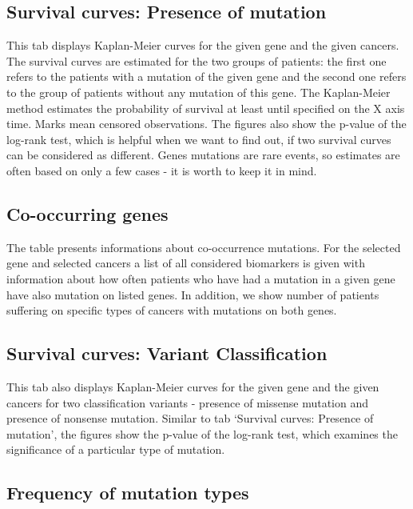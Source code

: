 \subsection{Survival curves: Presence of
mutation}\label{survival-curves-presence-of-mutation}

This tab displays Kaplan-Meier curves for the given gene and the given
cancers. The survival curves are estimated for the two groups of
patients: the first one refers to the patients with a mutation of the
given gene and the second one refers to the group of patients without
any mutation of this gene. The Kaplan-Meier method estimates the
probability of survival at least until specified on the X axis time.
Marks mean censored observations. The figures also show the p-value of
the log-rank test, which is helpful when we want to find out, if two
survival curves can be considered as different. Genes mutations are rare
events, so estimates are often based on only a few cases - it is worth
to keep it in mind.

\subsection{Co-occurring genes}\label{co-occurring-genes}

The table presents informations about co-occurrence mutations. For the
selected gene and selected cancers a list of all considered biomarkers
is given with information about how often patients who have had a
mutation in a given gene have also mutation on listed genes. In
addition, we show number of patients suffering on specific types of
cancers with mutations on both genes.

\subsection{Survival curves: Variant
Classification}\label{survival-curves-variant-classification}

This tab also displays Kaplan-Meier curves for the given gene and the
given cancers for two classification variants - presence of missense
mutation and presence of nonsense mutation. Similar to tab `Survival
curves: Presence of mutation', the figures show the p-value of the
log-rank test, which examines the significance of a particular type of
mutation.

\subsection{Frequency of mutation
types}\label{frequency-of-mutation-types}

